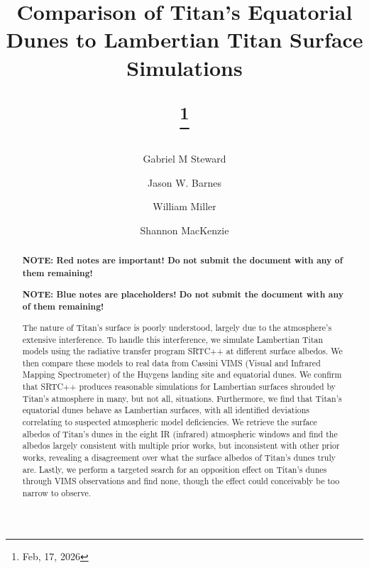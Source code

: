 \documentclass[twocolumn,linenumbers]{aastex631}
\begin{document}
\title{Comparison of Titan's Equatorial Dunes to Lambertian Titan Surface Simulations

\footnote{Feb, 17, 2026}}

\author[0000-0002-8482-4669]{Gabriel M Steward}


\author{Jason W. Barnes}


\author{William Miller}


\author{Shannon MacKenzie}


\begin{abstract}

\textbf{\color{red}NOTE: Red notes are important! Do not submit the document with any of them remaining!\color{black}}

\textbf{\color{blue}NOTE: Blue notes are placeholders! Do not submit the document with any of them remaining!\color{black}}

The nature of Titan's surface is poorly understood, largely due to the atmosphere's extensive interference. To handle this interference, we simulate Lambertian Titan models using the radiative transfer program SRTC++ at different surface albedos. We then compare these models to real data from Cassini VIMS (Visual and Infrared Mapping Spectrometer) of the Huygens landing site and equatorial dunes. We confirm that SRTC++ produces reasonable simulations for Lambertian surfaces shrouded by Titan's atmosphere in many, but not all, situations. Furthermore, we find that Titan's equatorial dunes behave as Lambertian surfaces, with all identified deviations correlating to suspected atmospheric model deficiencies. We retrieve the surface albedos of Titan's dunes in the eight IR (infrared) atmospheric windows and find the albedos largely consistent with multiple prior works, but inconsistent with other prior works, revealing a disagreement over what the surface albedos of Titan's dunes truly are. Lastly, we perform a targeted search for an opposition effect on Titan's dunes through VIMS observations and find none, though the effect could conceivably be too narrow to observe.

\end{abstract}
\end{document}
